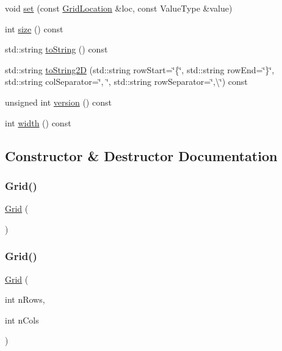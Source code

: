 \begin{DoxyCompactItemize}
\item 
void \mbox{\hyperlink{classGrid_a02a61287a9aee6a1ff7e8a8325ce094d}{set}} (const \mbox{\hyperlink{structGridLocation}{Grid\+Location}} \&loc, const Value\+Type \&value)
\item 
int \mbox{\hyperlink{classGrid_af9593d4a5ff4274efaf429cb4f9e57cc}{size}} () const
\item 
std\+::string \mbox{\hyperlink{classGrid_a1fe5121d6528fdea3f243321b3fa3a49}{to\+String}} () const
\item 
std\+::string \mbox{\hyperlink{classGrid_a8e636ad8b56218c7e0162d6c1bd78b39}{to\+String2D}} (std\+::string row\+Start=\char`\"{}\{\char`\"{}, std\+::string row\+End=\char`\"{}\}\char`\"{}, std\+::string col\+Separator=\char`\"{}, \char`\"{}, std\+::string row\+Separator=\char`\"{},\textbackslash{}\char`\"{}) const
\item 
unsigned int \mbox{\hyperlink{classGrid_a0aa696ccb72cbf928535d6b646bac1aa}{version}} () const
\item 
int \mbox{\hyperlink{classGrid_ad72663daf610f2a0833a2fc3d78e4fdf}{width}} () const
\end{DoxyCompactItemize}


\subsection{Constructor \& Destructor Documentation}
\mbox{\label{classGrid_a0a335d0339fe70071fcdf4cd5b1c7b5f}} 
\subsubsection{\texorpdfstring{Grid()}{Grid()}\hspace{0.1cm}{\footnotesize\ttfamily [1/5]}}
{\footnotesize\ttfamily \mbox{\hyperlink{classGrid}{Grid}} (\begin{DoxyParamCaption}{ }\end{DoxyParamCaption})}

\mbox{\label{classGrid_a2b85c90f2410379e8a679e3a791ace5f}} 
\subsubsection{\texorpdfstring{Grid()}{Grid()}\hspace{0.1cm}{\footnotesize\ttfamily [2/5]}}
{\footnotesize\ttfamily \mbox{\hyperlink{classGrid}{Grid}} (\begin{DoxyParamCaption}\item[{int}]{n\+Rows,  }\item[{int}]{n\+Cols }\end{DoxyParamCaption})}

